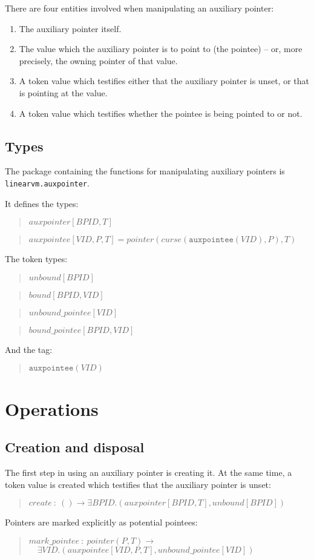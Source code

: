 \documentclass[a4paper]{book}
\newcommand\TypeDefinition[1]{\begin{quote}$\mathit{#1}$\end{quote}}
\newcommand\FuncSignature[2]{\begin{quote}$\mathit{#1}\ :\ \mathit{#2}$\end{quote}}
\newcommand\FuncSignatureII[3]{\begin{quote}$\mathit{#1}\ :\ \mathit{#2} \to$\\${}\quad \mathit{#3}$ \end{quote}}
\newcommand\TagDefinitionII[2]{\begin{quote}$\mathtt{#1}(\mathit{#2})$\end{quote}}
\begin{document}
\noindent
There are four entities involved when manipulating an auxiliary pointer:
\begin{enumerate}
\item The auxiliary pointer itself.
\item The value which the auxiliary pointer is to point to (the pointee) --
  or, more precisely, the owning pointer of that value.
\item A token value which testifies either that the auxiliary pointer is unset,
  or that is pointing at the value.
\item A token value which testifies whether the pointee is being
  pointed to or not.
\end{enumerate}

\subsection*{Types}
The package containing the functions for manipulating auxiliary pointers is
\texttt{linearvm.auxpointer}.

\smallskip
It defines the types:

\TypeDefinition{auxpointer[BPID,T]}
\TypeDefinition{auxpointee[VID,P,T] = pointer(curse(\texttt{auxpointee}(VID),P),T)}

The token types:

\TypeDefinition{unbound[BPID]}
\TypeDefinition{bound[BPID,VID]}
\TypeDefinition{unbound\_pointee[VID]}
\TypeDefinition{bound\_pointee[BPID,VID]}

And the tag:
\TagDefinitionII{auxpointee}{VID}


\section*{Operations}

\subsection*{Creation and disposal}
The first step in using an auxiliary pointer is creating it.
At the same time, a token value is created which testifies that the
auxiliary pointer is unset:
\FuncSignature{create}{() \to \exists BPID.(auxpointer[BPID,T], unbound[BPID])}

\noindent
Pointers are marked explicitly as potential pointees:
\FuncSignatureII{mark\_pointee}
{pointer(P,T)}
{\exists VID.(auxpointee[VID,P,T], unbound\_pointee[VID])
}
\end{document}
